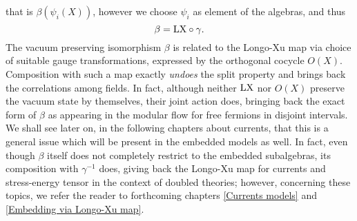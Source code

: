 that is $\beta(\psi_i(X))$, however we choose $\psi_i$
as element of the algebras, and thus 
\begin{equation}
\label{beta_versus_LX}
\beta=\textrm{LX}\circ\gamma.
\end{equation}
The vacuum preserving isomorphism $\beta$ is related to the 
Longo-Xu map via choice of suitable gauge transformations,
expressed by the orthogonal cocycle $O(X)$. Composition
with such a map exactly \emph{undoes} the split property and 
brings back the correlations among fields. In fact,
although neither $\textrm{LX}$ nor $O(X)$ preserve the 
vacuum state by themselves, their joint action does,
bringing back the exact form of $\beta$ as appearing
in the modular flow for free fermions in disjoint intervals.
We shall see later on, in the following chapters about 
currents, that this is a general issue which will be
present in the embedded models as well. In fact, 
even though $\beta$ itself does not completely restrict 
to the embedded subalgebras, its composition with $\gamma^{-1}$ 
does, giving back the Longo-Xu map for currents and 
stress-energy tensor in the context of doubled theories;
however, concerning these topics, we refer the reader
to forthcoming chapters 
\ref{Currents models} and \ref{Embedding via Longo-Xu map}.

















